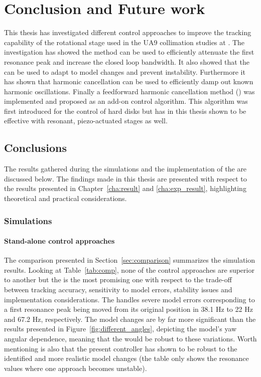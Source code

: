 \chapter{Conclusion and Future work}\label{cha:conclusion}
This thesis has investigated different control approaches to improve the tracking capability of the rotational stage used in the UA9 collimation studies at \abbrCERN. The investigation has showed the \abbrIRC method can be used to efficiently attenuate the first resonance peak and increase the closed loop bandwidth. It also showed that the \abbrMRACPE can be used to adapt to model changes and prevent instability. Furthermore it has shown that harmonic cancellation can be used to efficiently damp out known harmonic oscillations. Finally a feedforward harmonic cancellation method (\abbrRFDC) was implemented and proposed as an add-on control algorithm. This algorithm was first introduced for the control of hard disks but has in this thesis shown to be effective with resonant, piezo-actuated stages as well.

\section{Conclusions}
The results gathered during the simulations and the implementation of the \abbrRFDC are discussed below. The findings made in this thesis are presented with respect to the results presented in Chapter~\ref{cha:result} and \ref{cha:exp_result}, highlighting theoretical and practical considerations.

\subsection{Simulations}
\subsubsection{Stand-alone control approaches}
The comparison presented in Section~\ref{sec:comparison} summarizes the simulation results. Looking at Table~\ref{tab:comp}, none of the control approaches are superior to another but the \abbrIRC is the most promising one with respect to the trade-off between tracking accuracy, sensitivity to model errors, stability issues and implementation considerations. The \abbrIRC handles severe model errors corresponding to a first resonance peak being moved from its original position in 38.1 Hz to 22 Hz and 67.2 Hz, respectively. The model changes are by far more significant than the results presented in Figure~\ref{fig:different_angles}, depicting the model's yaw angular dependence, meaning that the \abbrIRC would be robust to these variations. Worth mentioning is also that the present controller has shown to be robust to the identified and more realistic model changes (the table only shows the resonance values where one approach becomes unstable).

